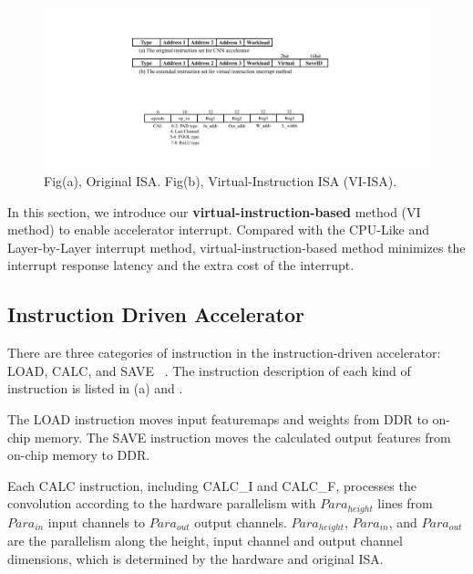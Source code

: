 \begin{figure}[t]
	\centering
	\includegraphics[width=0.99\linewidth]{fig/instructions.pdf}
	\vspace{-6mm}
	\caption{Fig(a), Original ISA. Fig(b), Virtual-Instruction ISA (VI-ISA).}
	\label{fig:instructions}
\end{figure}

In this section, we introduce our \textbf{virtual-instruction-based} method (VI method) to enable accelerator interrupt. Compared with the CPU-Like and Layer-by-Layer interrupt method, virtual-instruction-based method minimizes the interrupt response latency and the extra cost of the interrupt.

\subsection{ Instruction Driven Accelerator }
\label{sec:instrAcc}
There are three categories of instruction in the instruction-driven accelerator: LOAD, CALC, and SAVE  ~\cite{guo2017angel,qiu2016going,yu2018instruction}. The instruction description of each kind of instruction is listed in (a) and .

The LOAD instruction moves input featuremaps and weights from DDR to on-chip memory. The SAVE instruction moves the calculated output features from on-chip memory to DDR. 

Each CALC  instruction,  including CALC\_I and CALC\_F, processes the convolution according to the hardware parallelism with $Para_{height}$ lines from $ Para_{in} $ input channels to $ Para_{out}$ output channels. $Para_{height}$, $ Para_{in} $, and $ Para_{out} $ are the parallelism along the height, input channel and output channel dimensions, which is determined by the hardware and original ISA.


